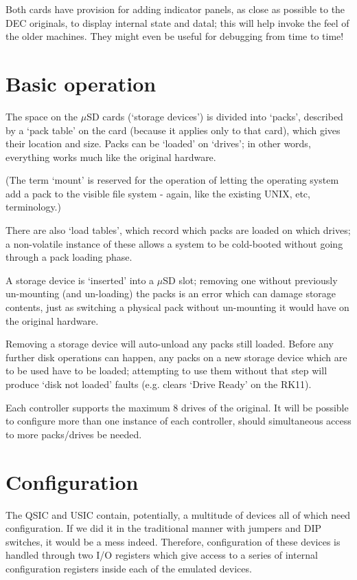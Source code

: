 Both cards have provision for adding indicator panels, as close as possible
to the DEC originals, to display internal state and datal; this will help
invoke the feel of the older machines. They might even be useful for
debugging from time to time!

\section{Basic operation}

The space on the $\mu$SD cards (`storage devices') is divided into `packs',
described by a `pack table' on the card (because it applies only to that
card), which gives their location and size. Packs can be `loaded' on
`drives'; in other words, everything works much like the original hardware.

(The term `mount' is reserved for the operation of letting the operating
system add a pack to the visible file system - again, like the existing UNIX,
etc, terminology.)

There are also `load tables', which record which packs are loaded on which
drives; a non-volatile instance of these allows a system to be cold-booted
without going through a pack loading phase.

A storage device is `inserted' into a $\mu$SD slot; removing one without
previously un-mounting (and un-loading) the packs is an error which can
damage storage contents, just as switching a physical pack without
un-mounting it would have on the original hardware.

Removing a storage device will auto-unload any packs still loaded. Before any
further disk operations can happen, any packs on a new storage device which
are to be used have to be loaded; attempting to use them without that step
will produce `disk not loaded' faults (e.g. clears `Drive Ready' on the RK11).

Each controller supports the maximum 8 drives of the original. It will be
possible to configure more than one instance of each controller, should
simultaneous access to more packs/drives be needed.

\section{Configuration}
\label{conf}

The QSIC and USIC contain, potentially, a multitude of devices all of
which need configuration.  If we did it in the traditional manner with
jumpers and DIP switches, it would be a mess indeed.  Therefore,
configuration of these devices is handled through two I/O registers
which give access to a series of internal configuration registers
inside each of the emulated devices.

